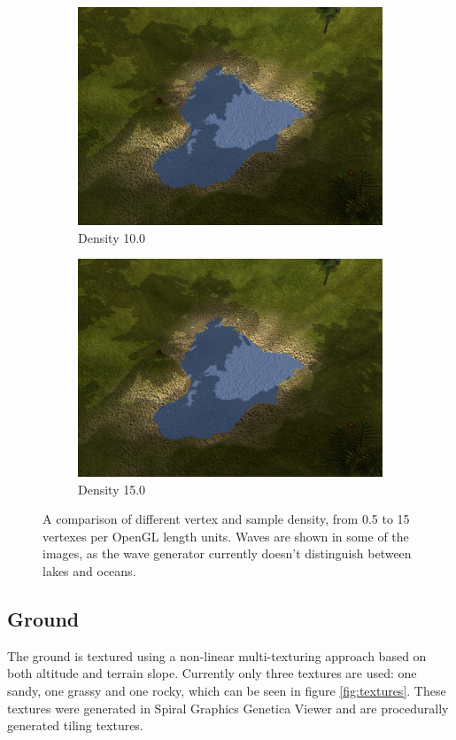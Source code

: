 \begin{figure}[H]
\begin{subfigure}{.5\textwidth}
  \centering
  \includegraphics[width=0.9\linewidth]{images/terrainDensityComparison1_10.jpg}
  \caption{Density 10.0}
  \label{fig:textureDensity10}
\end{subfigure}%
\begin{subfigure}{.5\textwidth}
  \centering
  \includegraphics[width=0.9\linewidth]{images/terrainDensityComparison1_15.jpg}
  \caption{Density 15.0}
  \label{fig:textureDensity15}
\end{subfigure}%
  \caption[Terrain with different vertex density.]{A comparison of different vertex and sample density, from 0.5 to 15 vertexes per OpenGL length units. Waves are shown in some of the images, as the wave generator currently doesn't distinguish between lakes and oceans.}
  \label{fig:textureDensityComparison1}
\end{figure}

\newpage
\subsection{Ground}
The ground is textured using a non-linear multi-texturing approach based on both altitude and terrain slope. Currently only three textures are used: one sandy, one grassy and one rocky, which can be seen in figure \ref{fig:textures}. These textures were generated in Spiral Graphics Genetica Viewer and are procedurally generated tiling textures.

